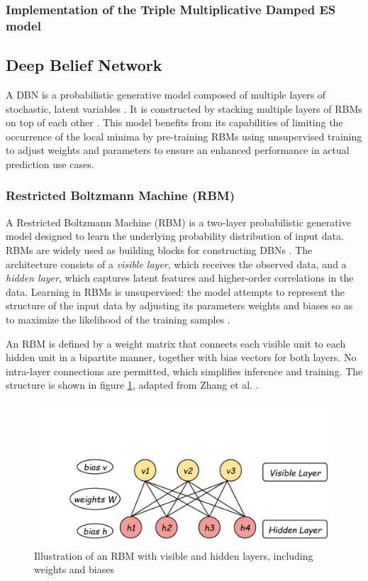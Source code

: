 \subsubsection{Implementation of the Triple Multiplicative Damped ES model}



\subsection{Deep Belief Network}
 
 A DBN is a probabilistic generative model composed of multiple layers of stochastic, latent variables \cite{zhang2017deep}. It is constructed by stacking multiple layers of RBMs on top of each other \cite{zhang2016short}. This model benefits from its capabilities of limiting the occurrence of the local minima by pre-training RBMs using unsupervised training to adjust weights and parameters to ensure an enhanced performance in actual prediction use cases.
 
\subsubsection{Restricted Boltzmann Machine (RBM)}

A Restricted Boltzmann Machine (RBM) is a two-layer probabilistic generative model designed to learn the underlying probability distribution of input data. RBMs are widely used as building blocks for constructing DBNs \cite{dong2021short}. The architecture consists of a \textit{visible layer}, which receives the observed data, and a \textit{hidden layer}, which captures latent features and higher-order correlations in the data. Learning in RBMs is unsupervised: the model attempts to represent the structure of the input data by adjusting its parameters weights and biases so as to maximize the likelihood of the training samples \cite{zhang2017deep}.

An RBM is defined by a weight matrix that connects each visible unit to each hidden unit in a bipartite manner, together with bias vectors for both layers. No intra-layer connections are permitted, which simplifies inference and training. The structure is shown in figure \ref{fig:singlerbm}, adapted from Zhang et al. \cite{zhang2017deep}.

\begin{figure}[ht]
	\centering
	\includegraphics[width=0.7\linewidth]{Chapters/images/singleRBM}
	\caption{Illustration of an RBM with visible and hidden layers, including weights and biases}
	\label{fig:singlerbm}
\end{figure}


